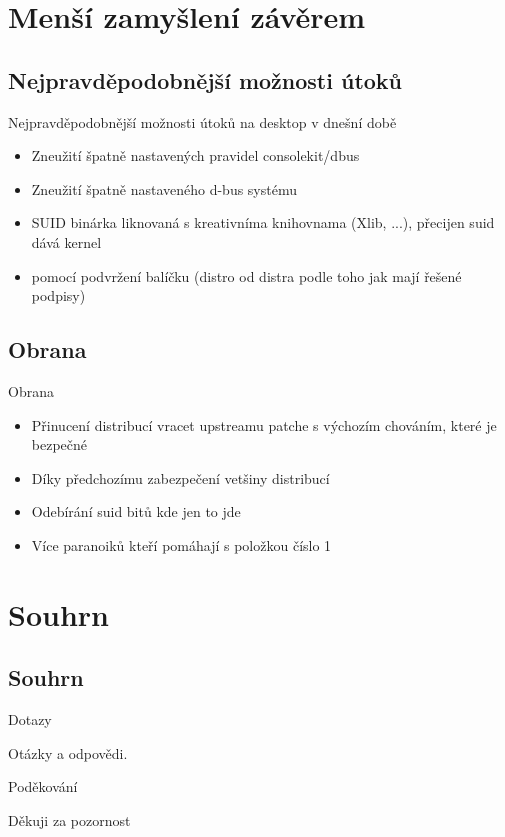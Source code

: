 \documentclass{beamer}
\begin{document}
\section{Menší zamyšlení závěrem}

\subsection{Nejpravděpodobnější možnosti útoků}

\begin{frame}{Nejpravděpodobnější možnosti útoků na desktop v dnešní době}
	\begin{itemize}
		\item Zneužití špatně nastavených pravidel consolekit/dbus
		\item Zneužití špatně nastaveného d-bus systému
		\item SUID binárka liknovaná s kreativníma knihovnama (Xlib, ...), přecijen suid dává kernel
		\item pomocí podvržení balíčku (distro od distra podle toho jak mají řešené podpisy)
	\end{itemize}
\end{frame}

\subsection{Obrana}

\begin{frame}{Obrana}
	\begin{itemize}
		\item Přinucení distribucí vracet upstreamu patche s výchozím chováním, které je bezpečné
		\item Díky předchozímu zabezpečení vetšiny distribucí
		\item Odebírání suid bitů kde jen to jde
		\item Více paranoiků kteří pomáhají s položkou číslo 1
	\end{itemize}
\end{frame}

\section{Souhrn}

\subsection{Souhrn}

\begin{frame}{Dotazy}
	\begin{center}Otázky a odpovědi.\end{center}
\end{frame}

\begin{frame}{Poděkování}
	\begin{center}Děkuji za pozornost\end{center}
\end{frame}
\end{document}
